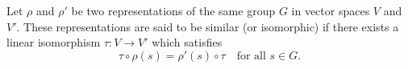Let $\rho$ and $\rho'$ be two representations of the same group $G$ in vector spaces $V$ and $V'$.
These representations are said to be similar (or isomorphic) if there exists a linear isomorphism $\tau: V \to V'$ which satisfies
$$\tau \circ \rho(s) = \rho'(s) \circ \tau \quad \text{for all } s \in G.$$
